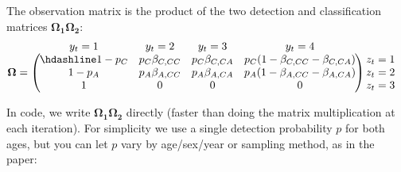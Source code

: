 \documentclass[
  12pt,
]{krantz}
\begin{document}
The observation matrix is the product of the two detection and classification matrices \(\mathbf{\Omega_1} \mathbf{\Omega_2}\):
\[\begin{matrix}
& \\
\mathbf{\Omega} =
    \left ( \vphantom{ \begin{matrix} 12 \\ 12 \\ 12\end{matrix} } \right .
\end{matrix}
\hspace{-1.2em}
\begin{matrix}
    y_t=1 & y_t=2 & y_t=3 & y_t=4\\ \hdashline
1-p_C & p_C \beta_{C,CC} & p_C \beta_{C,CA} & p_C (1 - \beta_{C,CC} - \beta_{C,CA})\\
1-p_A & p_A \beta_{A,CC} & p_A \beta_{A,CA} & p_A (1 - \beta_{A,CC} - \beta_{A,CA})\\
1 & 0 & 0 & 0\\
\end{matrix}
\hspace{-0.2em}
\begin{matrix}
& \\
\left . \vphantom{ \begin{matrix} 12 \\ 12 \\ 12\end{matrix} } \right )
    \begin{matrix}
    z_{t}=1 \\ z_{t}=2 \\ z_{t}=3
    \end{matrix}
\end{matrix}\]

In code, we write \(\mathbf{\Omega_1} \mathbf{\Omega_2}\) directly (faster than doing the matrix multiplication at each iteration). For simplicity we use a single detection probability \(p\) for both ages, but you can let \(p\) vary by age/sex/year or sampling method, as in the paper:
\end{document}
